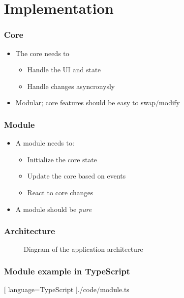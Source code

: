 \section{Implementation}
\SectionPage

\begin{frame}
  \frametitle{Core}
  \begin{itemize}
    \pause
    \item The core needs to
      \pause
      \begin{itemize}
        \item Handle the UI and state
        \pause
        \item Handle changes asyncronysly
      \end{itemize}
    \pause
    \item Modular; core features should be easy to swap/modify
  \end{itemize}
\end{frame}

\begin{frame}
  \frametitle{Module}
  \begin{itemize}
    \pause
    \item A module needs to:
      \pause
      \begin{itemize}
        \item Initialize the core state
        \pause
        \item Update the core based on events
        \pause
        \item React to core changes
      \end{itemize}
      \pause
    \item A module should be \textit{pure}
  \end{itemize}
\end{frame}

\begin{frame}
  \frametitle{Architecture}
  \begin{figure}[H]
    \centering
    
    \caption{
      Diagram of the application architecture
    }
  \end{figure}
\end{frame}

\begin{frame}
  \frametitle{Module example in TypeScript}
  \begin{center}
    
    [ language=TypeScript
    ]{./code/module.ts}
  \end{center}
\end{frame}

